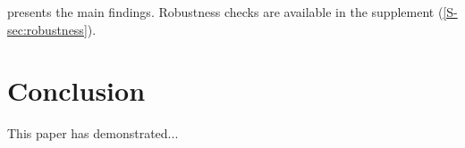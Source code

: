 \documentclass[12pt, draft, colorlinks, doublespace]{bp-article}
\begin{document}
 presents the main findings.
Robustness checks are available in the supplement (\cref{S-sec:robustness}).


\section{Conclusion} \label{sec:conclusion}

This paper has demonstrated...


\end{document}
